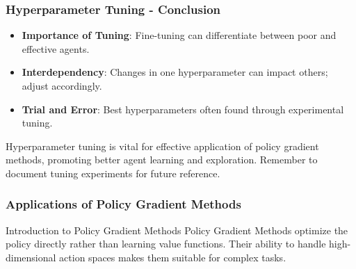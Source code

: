 \documentclass[aspectratio=169]{beamer}
\begin{document}
\begin{frame}[fragile]
    \frametitle{Hyperparameter Tuning - Conclusion}
    \begin{itemize}
        \item \textbf{Importance of Tuning}: Fine-tuning can differentiate between poor and effective agents.
        \item \textbf{Interdependency}: Changes in one hyperparameter can impact others; adjust accordingly.
        \item \textbf{Trial and Error}: Best hyperparameters often found through experimental tuning.
    \end{itemize}
    
    \vspace{0.5cm}
    
    Hyperparameter tuning is vital for effective application of policy gradient methods, promoting better agent learning and exploration. Remember to document tuning experiments for future reference.
\end{frame}

\begin{frame}[fragile]
    \frametitle{Applications of Policy Gradient Methods}
    \begin{block}{Introduction to Policy Gradient Methods}
        Policy Gradient Methods optimize the policy directly rather than learning value functions.\newline
        Their ability to handle high-dimensional action spaces makes them suitable for complex tasks.
    \end{block}
\end{frame}
\end{document}

